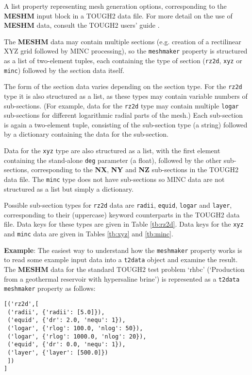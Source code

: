 A list property representing mesh generation options, corresponding to the \textbf{MESHM} input block in a TOUGH2 data file.  For more detail on the use of \textbf{MESHM} data, consult the TOUGH2 users' guide \citep{tough2}.

The \textbf{MESHM} data may contain multiple sections (e.g. creation of a rectilinear XYZ grid followed by MINC processing), so the \texttt{meshmaker} property is structured as a list of two-element tuples, each containing the type of section (\texttt{rz2d}, \texttt{xyz} or \texttt{minc}) followed by the section data itself.

The form of the section data varies depending on the section type.  For the \texttt{rz2d} type it is also structured as a list, as these types may contain variable numbers of sub-sections.  (For example, data for the \texttt{rz2d} type may contain multiple \texttt{logar} sub-sections for different logarithmic radial parts of the mesh.)  Each sub-section is again a two-element tuple, consisting of the sub-section type (a string) followed by a dictionary containing the data for the sub-section.

Data for the \texttt{xyz} type are also structured as a list, with the first element containing the stand-alone \texttt{deg} parameter (a float), followed by the other sub-sections, corresponding to the \textbf{NX}, \textbf{NY} and \textbf{NZ} sub-sections in the TOUGH2 data file.  The \texttt{minc} type does not have sub-sections so MINC data are not structured as a list but simply a dictionary.

Possible sub-section types for \texttt{rz2d} data are \texttt{radii}, \texttt{equid}, \texttt{logar} and \texttt{layer}, corresponding to their (uppercase) keyword counterparts in the TOUGH2 data file.  Data keys for these types are given in Table \ref{tb:rz2d}.  Data keys for the \texttt{xyz} and \texttt{minc} data are given in Tables \ref{tb:xyz} and \ref{tb:minc}.

\textbf{Example}: The easiest way to understand how the \texttt{meshmaker} property works is to read some example input data into a \texttt{t2data} object and examine the result.  The \textbf{MESHM} data for the standard TOUGH2 test problem `rhbc' (`Production from a geothermal reservoir with hypersaline brine') is represented as a \texttt{t2data} \texttt{meshmaker} property as follows:

\begin{lstlisting}
[('rz2d',[
 ('radii', {'radii': [5.0]}),
 ('equid', {'dr': 2.0, 'nequ': 1}),
 ('logar', {'rlog': 100.0, 'nlog': 50}),
 ('logar', {'rlog': 1000.0, 'nlog': 20}),
 ('equid', {'dr': 0.0, 'nequ': 1}),
 ('layer', {'layer': [500.0]})
 ])
]
\end{lstlisting}

